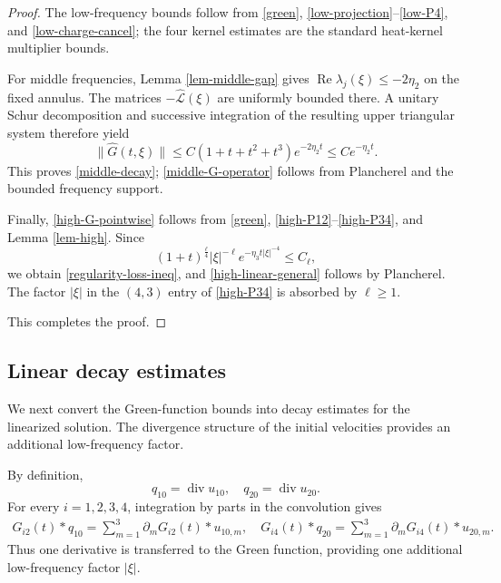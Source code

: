 \documentclass[10pt,reqno]{amsart}
\numberwithin{equation}{section}
\begin{document}
\begin{proof}
The low-frequency bounds follow from \eqref{green}, \eqref{low-projection}--\eqref{low-P4}, and \eqref{low-charge-cancel}; the four kernel estimates are the standard heat-kernel multiplier bounds.

 For middle frequencies, Lemma \ref{lem-middle-gap} gives
$\operatorname{Re}\lambda_j(\xi)\le-2\eta_2$ on the fixed annulus.
The matrices $-\widehat{\mathcal L}(\xi)$ are uniformly bounded there.
A unitary Schur decomposition and successive integration of the resulting
upper triangular system therefore yield
\[
\|\widehat G(t,\xi)\|
\le C(1+t+t^2+t^3)e^{-2\eta_2t}
\le Ce^{-\eta_2t}.
\]
This proves \eqref{middle-decay}; \eqref{middle-G-operator} follows from
Plancherel and the bounded frequency support.

Finally, \eqref{high-G-pointwise} follows from \eqref{green}, \eqref{high-P12}--\eqref{high-P34}, and Lemma \ref{lem-high}. Since
\[
(1+t)^{\frac{\ell}{4}}|\xi|^{-\ell}e^{-\eta_3  t|\xi|^{-4}}
\le C_\ell,
\]
we obtain \eqref{regularity-loss-ineq}, and \eqref{high-linear-general} follows by Plancherel. The factor $|\xi|$ in the $(4,3)$ entry of \eqref{high-P34} is absorbed by $\ell\ge1$.

This completes the proof.
\end{proof}


%
%
%
%
%
%


\subsection{Linear decay estimates}

We next convert the Green-function bounds into decay estimates for the linearized solution. The divergence structure of the initial velocities provides an additional low-frequency factor.


By definition,
\[
q_{10}=\operatorname{div}u_{10},\quad q_{20}=\operatorname{div}u_{20}.
\]
For every $i=1,2,3,4$, integration by parts in the convolution gives
\begin{align}\label{IBP-Green}
G_{i2}(t)*q_{10}
=\sum_{m=1}^3\partial_mG_{i2}(t)*u_{10,m},\quad
G_{i4}(t)*q_{20}
=\sum_{m=1}^3\partial_mG_{i4}(t)*u_{20,m}.
\end{align}
Thus one derivative is transferred to the Green function, providing one additional low-frequency factor $|\xi|$.
\end{document}
